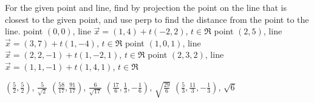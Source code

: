 
\begin{Exercise}[
name={},
title={}, 
difficulty=0,
origin={\cite{SM}}]
For the given point and line, find by projection the point on the line that is closest to the given point, and use perp to find the distance from the point to the line.
\Question point $(0,0)$, line $\vec{x}=(1,4)+t(-2,2)$, $t\in\Re$
\Question point $(2,5)$, line $\vec{x}=(3,7)+t(1,-4)$, $t\in\Re$
\Question point $(1,0,1)$, line $\vec{x}=(2,2,-1)+t(1,-2,1)$, $t\in\Re$
\Question point $(2,3,2)$, line $\vec{x}=(1,1,-1)+t(1,4,1)$, $t\in\Re$
\end{Exercise}

\begin{Answer}
\Question $\left(\frac{5}{2},\frac{5}{2}\right)$, $\frac{5}{\sqrt{2}}$
\Question $\left(\frac{58}{17},\frac{91}{17}\right)$, $\frac{6}{\sqrt{17}}$
\Question $\left(\frac{17}{6},\frac{1}{3},-\frac{1}{6}\right)$, $\sqrt{\frac{29}{6}}$
\Question $\left(\frac{5}{3},\frac{11}{3},-\frac{1}{3}\right)$, $\sqrt{6}$
\end{Answer}
